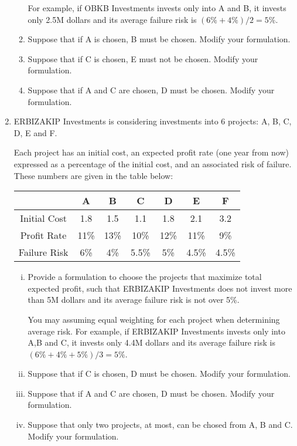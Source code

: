 \documentclass[a4paper,12pt]{article}
\begin{document}
\begin{enumerate}
\begin{enumerate}
  	For example, if  OBKB Investments invests only into A and B, it invests
  	only 2.5M dollars and its average failure risk is $(6\%+4\%)/2=5\%$.%
  	
  	\item Suppose that if A is chosen, B must be chosen. Modify your
  	formulation.%
  	\item Suppose that if C is chosen, E must not be chosen. Modify your
  	formulation.%
  	\item   Suppose that if A and C are chosen, D must be chosen. Modify your
  	formulation.%
  \end{enumerate}
\newpage
   		
\item 	ERBIZAKIP Investments is considering investments into 6 projects: A, B, C, D, E and F.
  
  Each project has an initial cost, an expected profit rate (one year from now) expressed as a
  percentage of the initial cost, and an associated risk of failure.
  These numbers are given in the table below:
  
  \begin{center}
  	\begin{tabular}{|c||c|c|c|c|c|c|}
  		\hline  & A & B & C & D & E & F \\ 
  		\hline Initial Cost & 1.8 & 1.5 & 1.1 & 1.8 & 2.1 & 3.2 \\ 
  		\hline Profit Rate & 11\% & 13\% & 10\% & 12\% & 11\% & 9\% \\ 
  		\hline Failure Risk & 6\% & 4\% & 5.5\% & 5\% & 4.5\%  & 4.5\%\\ 
  		\hline 
  	\end{tabular} 
  \end{center}
  \begin{enumerate}[(i)] \item  Provide a formulation to choose the projects that maximize total
  	expected profit, such that ERBIZAKIP Investments does not invest more than
  	5M dollars and its average failure risk is not over 5\%. 
  	
  	You may assuming equal weighting for each project when determining average risk. For example, if ERBIZAKIP Investments invests only into A,B and C, it invests
  	only 4.4M dollars and its average failure risk is $(6\%+4\% +5\%)/3=5\%$.
  	
  	\item Suppose that if C is chosen, D must be chosen. Modify your
  	formulation.
  	\item   Suppose that if A and C are chosen, D must be chosen. Modify your
  	formulation.
  	\item Suppose that only two projects, at most, can be chosed from A, B and C.  Modify your
  	formulation.
  \end{enumerate}		
  

\end{enumerate}
\end{document}
